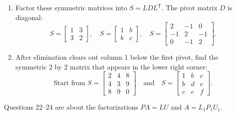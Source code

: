 \documentclass[14pt, a4paper]{article}
\begin{document}
\begin{enumerate}[resume]
    \item Factor these symmetric matrices into $S = LDL^{\mathrm{T}}$. The pivot matrix $D$ is diagonal:
          \[
              S = \begin{bmatrix}1 & 3 \\ 3 & 2\end{bmatrix},\quad
              S = \begin{bmatrix}1 & b \\ b & c\end{bmatrix},\quad
              S = \begin{bmatrix}2 & -1 & 0 \\ -1 & 2 & -1 \\ 0 & -1 & 2\end{bmatrix}.
          \]

    \item After elimination clears out column 1 below the first pivot, find the symmetric 2 by 2 matrix that appears in the lower right corner:
          \[
              \text{Start from } S = \begin{bmatrix}2 & 4 & 8 \\ 4 & 3 & 9 \\ 8 & 9 & 0\end{bmatrix} \quad\text{and}\quad S = \begin{bmatrix}1 & b & c \\ b & d & e \\ c & e & f\end{bmatrix}.
          \]
\end{enumerate}

\noindent Questions 22--24 are about the factorizations $PA = LU$ and $A = L_1P_1U_1$.
\end{document}

